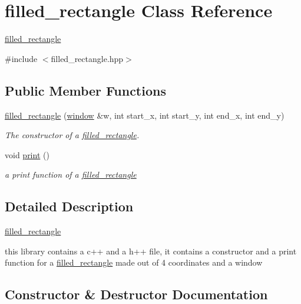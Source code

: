 \hypertarget{classfilled__rectangle}{}\section{filled\+\_\+rectangle Class Reference}
\label{classfilled__rectangle}


\hyperlink{classfilled__rectangle}{filled\+\_\+rectangle}  




{\ttfamily \#include $<$filled\+\_\+rectangle.\+hpp$>$}

\subsection*{Public Member Functions}
\begin{DoxyCompactItemize}
\item 
\hyperlink{classfilled__rectangle_aa8bbee29edffdb5374c6d99ed1bc8073}{filled\+\_\+rectangle} (\hyperlink{classwindow}{window} \&w, int start\+\_\+x, int start\+\_\+y, int end\+\_\+x, int end\+\_\+y)
\begin{DoxyCompactList}\small\item\em The constructor of a \hyperlink{classfilled__rectangle}{filled\+\_\+rectangle}. \end{DoxyCompactList}\item 
void \hyperlink{classfilled__rectangle_aef5f2d6c5d83663512e78a581b400214}{print} ()
\begin{DoxyCompactList}\small\item\em a print function of a \hyperlink{classfilled__rectangle}{filled\+\_\+rectangle} \end{DoxyCompactList}\end{DoxyCompactItemize}


\subsection{Detailed Description}
\hyperlink{classfilled__rectangle}{filled\+\_\+rectangle} 

this library contains a c++ and a h++ file, it contains a constructor and a print function for a \hyperlink{classfilled__rectangle}{filled\+\_\+rectangle} made out of 4 coordinates and a window 

\subsection{Constructor \& Destructor Documentation}
\mbox{\label{classfilled__rectangle_aa8bbee29edffdb5374c6d99ed1bc8073}} 
